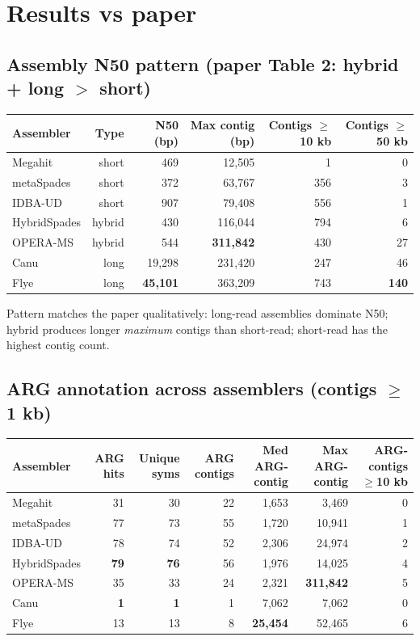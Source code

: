 \documentclass[11pt]{article}
\begin{document}
\section{Results vs paper}

\subsection{Assembly N50 pattern (paper Table 2: hybrid + long $>$ short)}
\begin{tabular}{lrrrrr}
\toprule
Assembler & Type & N50 (bp) & Max contig (bp) & Contigs $\geq$10 kb & Contigs $\geq$50 kb \\
\midrule
Megahit         & short  &     469 &  12{,}505 &   1 &   0 \\
metaSpades      & short  &     372 &  63{,}767 & 356 &   3 \\
IDBA-UD         & short  &     907 &  79{,}408 & 556 &   1 \\
HybridSpades    & hybrid &     430 & 116{,}044 & 794 &   6 \\
OPERA-MS        & hybrid &     544 & \textbf{311{,}842} & 430 &  27 \\
Canu            & long   & 19{,}298 & 231{,}420 & 247 &  46 \\
Flye            & long   & \textbf{45{,}101} & 363{,}209 & 743 & \textbf{140} \\
\bottomrule
\end{tabular}

Pattern matches the paper qualitatively: long-read assemblies dominate N50; hybrid produces longer \textit{maximum} contigs than short-read; short-read has the highest contig count.

\subsection{ARG annotation across assemblers (contigs $\geq$1 kb)}
\begin{tabular}{lrrrrrr}
\toprule
Assembler & ARG hits & Unique syms & ARG contigs & Med ARG-contig & Max ARG-contig & ARG-contigs $\geq$10 kb \\
\midrule
Megahit        & 31 & 30 & 22 & 1{,}653  &  3{,}469 & 0 \\
metaSpades     & 77 & 73 & 55 & 1{,}720  & 10{,}941 & 1 \\
IDBA-UD        & 78 & 74 & 52 & 2{,}306  & 24{,}974 & 2 \\
HybridSpades   & \textbf{79} & \textbf{76} & 56 & 1{,}976 & 14{,}025 & 4 \\
OPERA-MS       & 35 & 33 & 24 & 2{,}321 & \textbf{311{,}842} & 5 \\
Canu           & \textbf{1} & \textbf{1} & 1 & 7{,}062 & 7{,}062 & 0 \\
Flye           & 13 & 13 &  8 & \textbf{25{,}454} & 52{,}465 & 6 \\
\bottomrule
\end{tabular}
\end{document}

